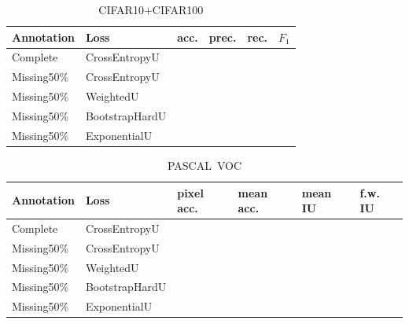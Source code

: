 \begin{table}
\begin{center}
\begin{tabular}{ll|llll}
Annotation  & Loss & acc. & prec. & rec. & $F_1$ \\
\hline
Complete    & CrossEntropyU  &  &  & & \\
Missing50\% & CrossEntropyU & & & & \\
Missing50\% & WeightedU   &  &  & & \\
Missing50\% & BootstrapHardU  &  &  & & \\
Missing50\% & ExponentialU  &  &  & & \\
\end{tabular}
\end{center}
\caption{CIFAR10+CIFAR100}
\end{table}


\begin{table}
\begin{center}
\begin{tabular}{ll|llll}
Annotation  & Loss & pixel acc. & mean acc. & mean IU & f.w. IU \\
\hline
Complete    & CrossEntropyU  &  &  & & \\
Missing50\% & CrossEntropyU & & & & \\
Missing50\% & WeightedU   &  &  & & \\
Missing50\% & BootstrapHardU  &  &  & & \\
Missing50\% & ExponentialU  &  &  & & \\
\end{tabular}
\end{center}
\caption{PASCAL\ VOC}
\end{table}
